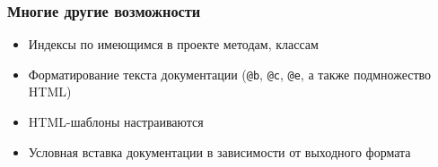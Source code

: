 \documentclass[onlymath]{beamer}
\begin{document}
\begin{frame}
  \frametitle{Многие другие возможности}
  \begin{itemize}
  \item Индексы по имеющимся в проекте методам, классам
  \item Форматирование текста документации (\texttt{@b}, \texttt{@c},
    \texttt{@e}, а также подмножество HTML)
  \item HTML-шаблоны настраиваются
  \item Условная вставка документации в зависимости от выходного формата
  \end{itemize}
\end{frame}
\end{document}
